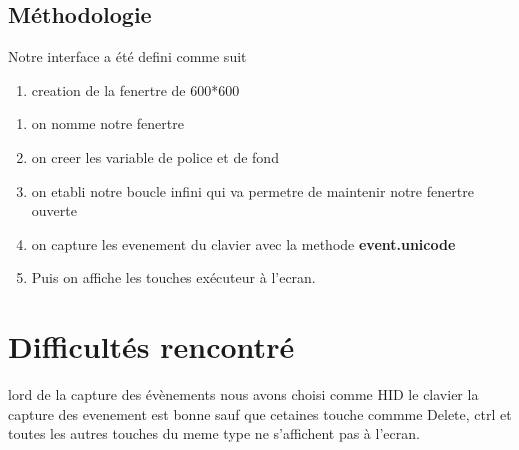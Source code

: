 \documentclass{article}
\begin{document}
\subsection {Méthodologie}
Notre interface a été defini comme suit
\begin{enumerate}
    \item creation de la fenertre de 600*600
\end{enumerate}
 \begin{enumerate}
     \item on nomme notre fenertre
     \item on creer les variable de police et de fond
     \item on etabli notre boucle infini qui va permetre de maintenir notre fenertre ouverte
      \item on capture les evenement du clavier avec la methode \textbf{event.unicode}
      \item Puis on affiche les touches exécuteur à l'ecran.
 \end{enumerate}

\section{ Difficultés rencontré}
lord de la capture des évènements nous avons choisi comme HID le clavier la capture des evenement est bonne sauf que cetaines touche commme Delete, ctrl et toutes les autres touches du meme type ne s'affichent pas à l'ecran.
\end{document}
